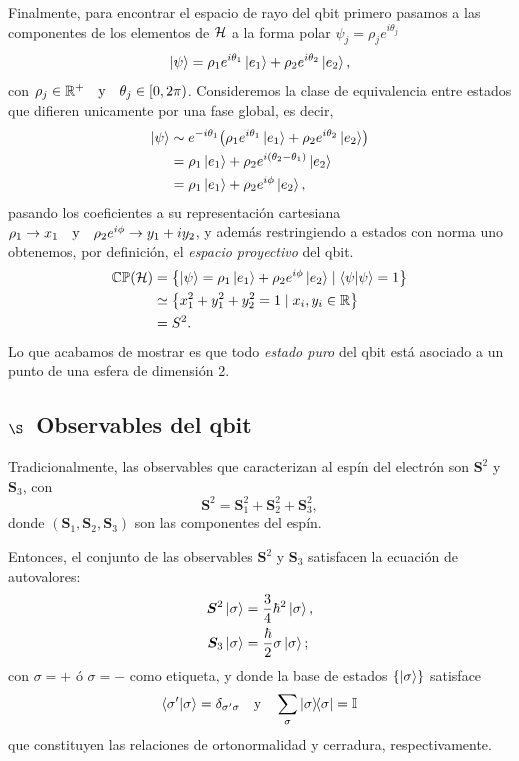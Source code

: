 \documentclass[../Main.tex]{subfiles}
\begin{document}
Finalmente, para encontrar el espacio de rayo del qbit primero pasamos a las componentes de los elementos de $\mathcal{H}$ a la forma polar $\psi_j=\rho_je^{i\theta_j}$
\begin{equation}
   \ket{\psi}= \rho_1 e^{i\theta_1}\ket{e_1}+\rho_2 e^{i\theta_2}\ket{e_2},
\end{equation}
con $\rho_j\in\R^+\qq{y}\theta_j\in[0,2\pi)$.
Consideremos la clase de equivalencia entre estados que difieren unicamente por una fase global, es decir,
\begin{align}
    \ket{\psi}
    &\sim  e^{-i\theta_1}\qty(\rho_1e^{i\theta_1}\ket{e_1}+\rho_2e^{i\theta_2}\ket{e_2})\notag\\
    &=\rho_1\ket{e_1}+\rho_2e^{i(\theta_2-\theta_1)}\ket{e_2}\notag\\
    &=\rho_1\ket{e_1}+\rho_2e^{i\phi}\ket{e_2},
\end{align}
pasando los coeficientes a su representación cartesiana $\rho_1\to x_1\qq{y}\rho_2e^{i\phi}\to y_1+iy_2$, y además restringiendo a estados con norma uno obtenemos, por definición, el \emph{espacio proyectivo} del qbit. 
\begin{align}
    \C\Proj(\H)&=
    \qty{\ket{\psi}=\rho_1\ket{e_1}+\rho_2e^{i\phi}\ket{e_2}\mid\ip{\psi}=1}\notag\\
    &\simeq\qty{x_1^2+y_1^2+y_2^2=1\mid x_i,y_i\in\R}\notag\\
    &=S^2.
    \label{eq:espacio_proyectivo_qbit}
\end{align}
Lo que acabamos de mostrar es que todo \emph{estado puro} del qbit está asociado a un punto de una esfera de dimensión 2.

\subsection*{$\S$~Observables del qbit}

Tradicionalmente, las observables que caracterizan al espín del electrón son $\bm{S}^2$ y $\bm{S}_3$, con 
\begin{equation}
    \bm{S}^2=\bm{S}_1^2+\bm{S}_2^2+\bm{S}_3^2,
\end{equation}
donde $(\bm{S}_1,\bm{S}_2,\bm{S}_3)$ son las componentes del espín.

Entonces, el conjunto de las observables $\bm{S}^2$ y $\bm{S}_3$ satisfacen la ecuación de autovalores:
\begin{subequations}\label{eq:autovalores_espin}
    \begin{align}
        \bm{S}^2\ket{\sigma}&=\frac{3}{4}\hbar^2\ket{\sigma},\\
        \bm{S}_3\ket{\sigma}&=\frac{\hbar}{2}\sigma\ket{\sigma};
    \end{align}
\end{subequations}
con $\sigma= +$ ó $\sigma=-$ como etiqueta, y donde la base de estados $\qty{\ket{\sigma}}$ satisface
\begin{equation}
    \ip{\sigma^\prime}{\sigma}=\delta_{\sigma^\prime\sigma}\qq{y}\sum_\sigma \op{\sigma}=\Id
\end{equation} 
que constituyen las relaciones de ortonormalidad y cerradura, respectivamente.
\end{document}
